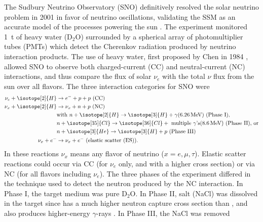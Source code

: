The Sudbury Neutrino Observatory (SNO) definitively resolved
the solar neutrino problem in 2001 in favor of neutrino oscillations,
validating the SSM as an accurate model of the processes powering the sun
\cite{sno2001}.
The experiment monitored \SI{1}{\tonne} of heavy water ($\text{D}_2\text{O}$)
surrounded by a spherical array of photomultiplier tubes (PMTs)
which detect the Cherenkov radiation produced by neutrino interaction products.
The use of heavy water, first proposed by Chen in 1984 \cite{chen_d2o},
allowed SNO to observe both charged-current (CC)
and neutral-current (NC) interactions,
and thus compare the flux of solar $\nu_e$ with the total $\nu$ flux
from the sun over all flavors.
The three interaction categories for SNO were
\begin{align}\label{eq:sno_interactions}
    \begin{split}
        \nu_e + \isotope[2]{H} & \to e^- + p + p \text{ (CC)} \\
        \nu_x + \isotope[2]{H} & \to \nu_x + n + p  \text{ (NC)}\\
                               & \text{with }n + \isotope[2]{H} \to
                               \isotope[3]{H} + \gamma (\SI{6.26}{\MeV})
                               \text{ (Phase I),} \\
                               & n + \isotope[35]{Cl} \to
                               \isotope[36]{Cl} + \text{ multiple }\gamma\text{'s}
                               (\SI{8.6}{\MeV})
                               \text{ (Phase II), or} \\
                               & n + \isotope[3]{He} \to
                               \isotope[3]{H} + p \text{ (Phase III)}\\
        \nu_x + e^- & \to \nu_x + e^- \text{ (elastic scatter (ES))}.
    \end{split}
\end{align}
In these reactions $\nu_x$ means any flavor of neutrino ($x = e,\mu,\tau$).
Elastic scatter reactions could occur via CC (for $\nu_e$ only, and with a higher cross section)
or via NC (for all flavors including $\nu_e$).
The three phases of the experiment differed in the technique
used to detect the neutron produced by the NC interaction.
In Phase I, the target medium was pure $\text{D}_2\text{O}$.
In Phase II, salt (NaCl) was dissolved in the target
since  has a much higher neutron capture cross section
than , and also produces higher-energy $\gamma$-rays \cite{sno_salt2004}.
In Phase III, the NaCl was removed
